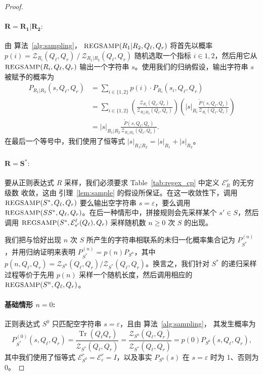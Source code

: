 \documentclass[twoside]{article}
\newcommand{\Sample}{\textsc{\small REGSAMP}}
\DeclareMathOperator{\Tr}{Tr}
\newcommand{\EL}{\mc{E}^{\scriptstyle \ell}}
\newcommand{\ER}{\mc{E}^{\scriptstyle r}}
\newcommand{\QL}{Q_{\ell}}
\newcommand{\QR}{Q_{r}}
\newcommand{\Pt}{\tilde{P}}
\newcommand{\mc}[1]{\mathcal{#1}}
\begin{document}
\begin{proof}
\paragraph{$\mathbf{R = R_1 | R_2:}$} 由 算法~\ref{alg:sampling}，
$\Sample(R_1 | R_2, \QL, \QR)$ 将首先以概率 $p(i) = \mc{Z}_{R_i}(\QL, \QR) \ / \ \mc{Z}_{R_1 | R_2}(\QL, \QR)$ 随机选取一个指标 $i \in {1, 2}$，然后用它从 $\Sample(R_i, \QL, \QR)$ 输出一个字符串 $s$。使用我们的归纳假设，输出字符串 $s$ 被赋予的概率为
%
\begin{align*}
    P_{R_1 | R_2}(s, \QL, \QR) &= \sum_{i \in \{1, 2\}} p(i) \cdot P_{R_i}(s_i, \QL, \QR) \\
    &= \sum_{i \in \{1, 2\}} \left( \frac{\mc{Z}_{R_i}(\QL, \QR)}{\mc{Z}_{R_1 | R_2}(\QL, \QR)} \right) \left( |s|_{R_i} \frac{\Pt(s, \QL, \QR)}{\mc{Z}_{R_i}(\QL, \QR)} \right) \\
    &= |s|_{R_1 | R_2} \frac{\Pt(s, \QL, \QR)}{\mc{Z}_{R_1 | R_2}(\QL, \QR)}.
\end{align*}
%
在最后一个等号中，我们使用了恒等式 $|s|_{R_1 | R_2} = |s|_{R_1} + |s|_{R_2}$。

\paragraph{$\mathbf{R = S^*:}$} 要从正则表达式 $R$ 采样，我们必须要求 Table~\ref{tab:regex_cp} 中定义 $\ER_R$ 的无穷级数
收敛，这由 引理~\ref{lem:sample} 的假设所保证。在这一收敛性下，调用 $\Sample(S^*, \QL, \QR)$ 要么输出空字符串 $s = \varepsilon$，要么调用 $\Sample(SS^*, \QL, \QR)$。在后一种情形中，拼接规则会先采样某个 $s' \in S$，然后调用 $\Sample(S^*, \EL_{s'}(\QL), \QR)$ 采样随机数 $n \geq 0$ 次 $S$ 的出现。

我们把与恰好出现 $n$ 次 $S$ 所产生的字符串相联系的未归一化概率集合记为 $P_{S^*}^{(n)}$，并用归纳证明来表明 $P_{S^*}^{(n)} = p(n) P_{S^n}$，其中 $p(n, \QL, \QR) = \mc{Z}_{S^n}(\QL, \QR) / \mc{Z}_{S^*}(\QL, \QR)$。换言之，我们针对 $S^*$ 的递归采样过程等价于先用 $p(n)$ 采样一个随机长度，然后调用相应的 $\Sample(S^n, \QL, \QR)$。

\paragraph{\textbf{基础情形} $n = 0$: } 正则表达式 $S^0$ 只匹配空字符串 $s = \varepsilon$，且由 算法~\ref{alg:sampling}，
其发生概率为
%
\begin{equation*}
    P_{S^*}^{(0)}(s, \QL, \QR) = \frac{\Tr(\QL \QR)}{\mc{Z}_{S^*}(\QL, \QR)} = \frac{\mc{Z}_{S^0}(\QL, \QR)}{\mc{Z}_{S^*}(\QL, \QR)} = p(0) P_{S^0}(s, \QL, \QR),
\end{equation*}
%
其中我们使用了恒等式 $\ER_{S^0} = \ER_\varepsilon = I$，以及事实 $P_{S^0}(s)$ 在 $s = \varepsilon$ 时为 1、否则为 0。


\end{proof}
\end{document}
